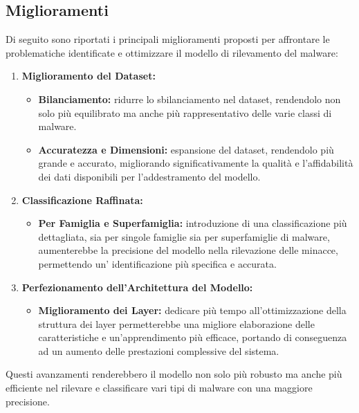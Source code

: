 \subsection{Miglioramenti}
Di seguito sono riportati i principali miglioramenti proposti per affrontare le problematiche identificate e ottimizzare il modello di rilevamento del malware:
\begin{enumerate}
    \item \textbf{Miglioramento del Dataset:}
      \begin{itemize}
        \item \textbf{Bilanciamento:} ridurre lo sbilanciamento nel dataset, rendendolo non solo più equilibrato ma anche più rappresentativo delle varie classi di malware.
        \item \textbf{Accuratezza e Dimensioni:} espansione del dataset, rendendolo più grande e accurato, migliorando significativamente la qualità e l'affidabilità dei dati disponibili per l'addestramento del modello.
      \end{itemize}
  
    \item \textbf{Classificazione Raffinata:}
      \begin{itemize}
        \item \textbf{Per Famiglia e Superfamiglia:} introduzione di una classificazione più dettagliata, sia per singole famiglie sia per superfamiglie di malware, aumenterebbe la precisione del modello nella rilevazione delle minacce, permettendo un' identificazione più specifica e accurata.
      \end{itemize}
  
    \item \textbf{Perfezionamento dell'Architettura del Modello:}
      \begin{itemize}
        \item \textbf{Miglioramento dei Layer:} dedicare più tempo all'ottimizzazione della struttura dei layer permetterebbe una migliore elaborazione delle caratteristiche e un'apprendimento più efficace, portando di conseguenza ad un aumento delle prestazioni complessive del sistema.
      \end{itemize}
  \end{enumerate}
  
Questi avanzamenti renderebbero il modello non solo più robusto ma anche più efficiente nel rilevare e classificare vari tipi di malware con una maggiore precisione.
  